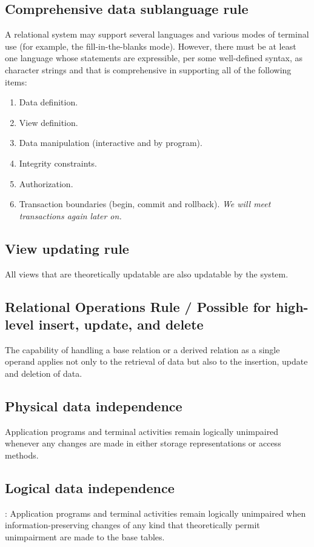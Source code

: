 \documentclass[slides]{pgnotes}
\begin{document}
\subsection{Comprehensive data sublanguage rule}
  A relational system may support several languages and various modes of terminal use (for example, the fill-in-the-blanks mode). However, there must be at least one language whose statements are expressible, per some well-defined syntax, as character strings and that is comprehensive in supporting all of the following items:
  \begin{enumerate}
  \item Data definition.
  \item View definition.
  \item Data manipulation (interactive and by program).
  \item Integrity constraints.
  \item Authorization.
  \item Transaction boundaries (begin, commit and rollback). \textit{We will meet transactions again later on.}
  \end{enumerate}

\subsection{View updating rule}
  All views that are theoretically updatable are also updatable by the system.

\subsection{Relational Operations Rule / Possible for high-level insert, update, and delete}
  The capability of handling a base relation or a derived relation as a single operand applies not only to the retrieval of data but also to the insertion, update and deletion of data.

\subsection{Physical data independence}
  Application programs and terminal activities remain logically unimpaired whenever any changes are made in either storage representations or access methods.

\subsection{Logical data independence}:
  Application programs and terminal activities remain logically unimpaired when information-preserving changes of any kind that theoretically permit unimpairment are made to the base tables.
\end{document}
